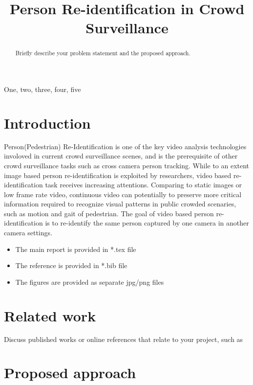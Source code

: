 \documentclass{article}
\title{Person Re-identification in Crowd Surveillance}
\begin{document}
%
\maketitle
%
\begin{abstract}

Briefly describe your problem statement and the proposed approach.

\end{abstract}
%
\begin{keywords}
One, two, three, four, five
\end{keywords}
%
\section{Introduction}
\label{sec:intro}

Person(Pedestrian) Re-Identification is one of the key video analysis technologies involoved in current crowd surveillance scenes, and is the prerequisite of other crowd surveillance tasks such as cross camera person tracking. While to an extent image based person re-identification is exploited by researchers, video based re-identification task receives increasing attentions. Comparing to static images or low frame rate video, continuous video can potentially to preserve more critical information required to recognize visual patterns in public crowded scenaries, such as motion and gait of pedestrian. The goal of video based person re-identification is to re-identify the same person captured by one camera in another camera settings. 

\begin{itemize}
  \item The main report is provided in *.tex file
  \item The reference is provided in *.bib file
  \item The figures are provided as separate jpg/png files
\end{itemize}


\section{Related work}

Discuss published works or online references that relate to your project, such as \cite{adams1995hitchhiker}

\section{Proposed approach}
\label{sec:proposed approach}
\end{document}
